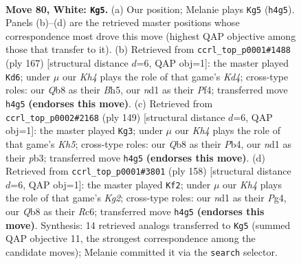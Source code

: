 \documentclass[11pt]{article}
\begin{document}
\clearpage

\begin{figure}[p]\centering
\begin{subfigure}{0.46\textwidth}\centering
\resizebox{\linewidth}{!}{%
\newchessgame
\chessboard[
  setfen={1Q6/7k/P3b3/8/7K/8/8/3n4 w - - 1 80},
  showmover=false,
  pgfstyle=straightmove, color=movearrow, markmove={h4-g5}
]}
\caption{}
\end{subfigure}\hfill
\begin{subfigure}{0.46\textwidth}\centering
\resizebox{\linewidth}{!}{%
\newchessgame
\chessboard[
  setfen={8/8/8/1P1k3b/5p2/8/8/4K1B1 b - - 7 84},
  showmover=false,
  pgfstyle=straightmove, color=movearrow, markmove={d5-d6}
]}
\caption{}
\end{subfigure}
\\[4pt]
\begin{subfigure}{0.46\textwidth}\centering
\resizebox{\linewidth}{!}{%
\newchessgame
\chessboard[
  setfen={8/3B4/8/8/1p5k/1P6/8/2b3K1 b - - 13 75},
  showmover=false,
  pgfstyle=straightmove, color=movearrow, markmove={h4-g3}
]}
\caption{}
\end{subfigure}\hfill
\begin{subfigure}{0.46\textwidth}\centering
\resizebox{\linewidth}{!}{%
\newchessgame
\chessboard[
  setfen={3b4/6k1/2R5/4p3/6P1/8/6K1/8 w - - 19 80},
  showmover=false,
  pgfstyle=straightmove, color=movearrow, markmove={g2-f2}
]}
\caption{}
\end{subfigure}
\caption{\textbf{Move 80, White: \texttt{Kg5}.} (a) Our position; Melanie plays \texttt{Kg5} (\texttt{h4g5}). Panels (b)--(d) are the retrieved master positions whose correspondence most drove this move (highest QAP objective among those that transfer to it). (b) Retrieved from \texttt{ccrl\_top\_p0001\#1488} (ply 167) [structural distance $d$=6, QAP obj=1]: the master played \texttt{Kd6}; under $\mu$ our \emph{Kh4} plays the role of that game's \emph{Kd4}; cross-type roles: our \emph{Q}b8 as their \emph{B}h5, our \emph{n}d1 as their \emph{P}f4; transferred move \texttt{h4g5} \textbf{(endorses this move)}. (c) Retrieved from \texttt{ccrl\_top\_p0002\#2168} (ply 149) [structural distance $d$=6, QAP obj=1]: the master played \texttt{Kg3}; under $\mu$ our \emph{Kh4} plays the role of that game's \emph{Kh5}; cross-type roles: our \emph{Q}b8 as their \emph{P}b4, our \emph{n}d1 as their \emph{p}b3; transferred move \texttt{h4g5} \textbf{(endorses this move)}. (d) Retrieved from \texttt{ccrl\_top\_p0001\#3801} (ply 158) [structural distance $d$=6, QAP obj=1]: the master played \texttt{Kf2}; under $\mu$ our \emph{Kh4} plays the role of that game's \emph{Kg2}; cross-type roles: our \emph{n}d1 as their \emph{P}g4, our \emph{Q}b8 as their \emph{R}c6; transferred move \texttt{h4g5} \textbf{(endorses this move)}. Synthesis: 14 retrieved analogs transferred to \texttt{Kg5} (summed QAP objective 11, the strongest correspondence among the candidate moves); Melanie committed it via the \texttt{search} selector.}
\label{fig:thought-m158}
\end{figure}
\end{document}
